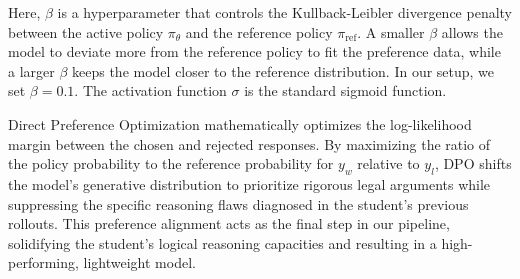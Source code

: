 Here, $\beta$ is a hyperparameter that controls the Kullback-Leibler divergence penalty between the active policy $\pi_\theta$ and the reference policy $\pi_{\text{ref}}$. A smaller $\beta$ allows the model to deviate more from the reference policy to fit the preference data, while a larger $\beta$ keeps the model closer to the reference distribution. In our setup, we set $\beta = 0.1$. The activation function $\sigma$ is the standard sigmoid function.

Direct Preference Optimization mathematically optimizes the log-likelihood margin between the chosen and rejected responses. By maximizing the ratio of the policy probability to the reference probability for $y_w$ relative to $y_l$, DPO shifts the model's generative distribution to prioritize rigorous legal arguments while suppressing the specific reasoning flaws diagnosed in the student's previous rollouts. This preference alignment acts as the final step in our pipeline, solidifying the student's logical reasoning capacities and resulting in a high-performing, lightweight model.

